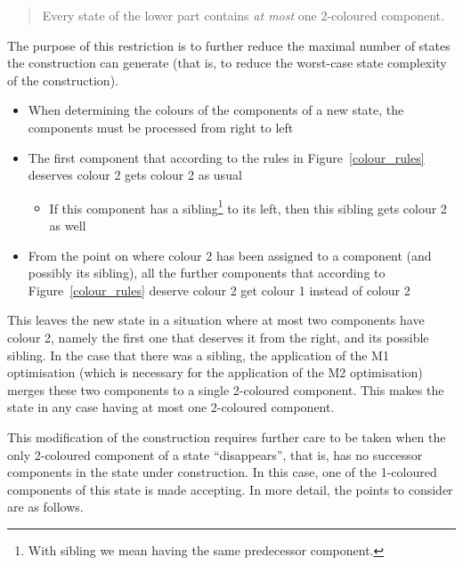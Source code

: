 \begin{quote}
Every state of the lower part contains \textit{at most} one 2-coloured component.
\end{quote}

The purpose of this restriction is to further reduce the maximal number of states the construction can generate (that is, to reduce the worst-case state complexity of the construction).

\begin{itemize}
\item When determining the colours of the components of a new state, the components must be processed from right to left
\item The first component that according to the rules in Figure~\ref{colour_rules} deserves colour 2 gets colour 2 as usual
  \begin{itemize}
  \item If this component has a sibling\footnote{With sibling we mean having the same predecessor component.} to its left, then this sibling gets colour 2 as well
  \end{itemize}
\item From the point on where colour 2 has been assigned to a component (and possibly its sibling), all the further components that according to Figure~\ref{colour_rules} deserve colour 2 get colour 1 instead of colour 2
\end{itemize}

This leaves the new state in a situation where at most two components have colour 2, namely the first one that deserves it from the right, and its possible sibling. In the case that there was a sibling, the application of the M1 optimisation (which is necessary for the application of the M2 optimisation) merges these two components to a single 2-coloured component. This makes the state in any case having at most one 2-coloured component.

This modification of the construction requires further care to be taken when the only 2-coloured component of a state ``disappears'', that is, has no successor components in the state under construction. In this case, one of the 1-coloured components of this state is made accepting. In more detail, the points to consider are as follows.

